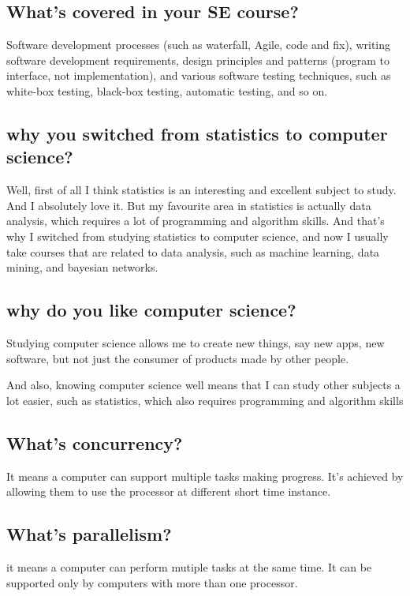 \documentclass[12pt, landscape]{article}
\begin{document}
\begin{multicols}{2}
\subsection{What's covered in your SE course?}
Software development processes (such as waterfall, Agile, code and fix), writing software development requirements, design principles and patterns (program to interface, not implementation), and various software testing techniques, such as white-box testing, black-box testing, automatic testing, and so on.

\subsection{why you switched from statistics to computer science?}
Well, first of all I think statistics is an interesting and excellent subject to study. And I absolutely love it. But my favourite area in statistics is actually data analysis, which requires a lot of programming and algorithm skills. And that's why I switched from studying statistics to computer science, and now I usually take courses that are related to data analysis, such as machine learning, data mining, and bayesian networks.

\subsection{why do you like computer science?}
Studying computer science allows me to create new things, say new apps, new software, but not just the consumer of products made by other people. 

And also, knowing computer science well means that I can study other subjects a lot easier, such as statistics, which also requires programming and algorithm skills 

\subsection{What's concurrency?}
It means a computer can support multiple tasks making progress. It's achieved by allowing them to use the processor at different short time instance. 

\subsection{What's parallelism?}
it means a computer can perform mutiple tasks at the same time. It can be supported only by computers with more than one processor.


\end{multicols}
\end{document}
